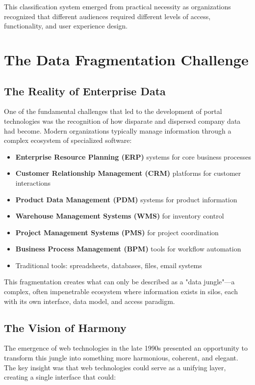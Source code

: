 This classification system emerged from practical necessity as organizations recognized that different audiences required different levels of access, functionality, and user experience design.

\section{The Data Fragmentation Challenge}

\subsection{The Reality of Enterprise Data}

One of the fundamental challenges that led to the development of portal technologies was the recognition of how disparate and dispersed company data had become. Modern organizations typically manage information through a complex ecosystem of specialized software:

\begin{itemize}
\item \textbf{Enterprise Resource Planning (ERP)} systems for core business processes
\item \textbf{Customer Relationship Management (CRM)} platforms for customer interactions
\item \textbf{Product Data Management (PDM)} systems for product information
\item \textbf{Warehouse Management Systems (WMS)} for inventory control
\item \textbf{Project Management Systems (PMS)} for project coordination
\item \textbf{Business Process Management (BPM)} tools for workflow automation
\item Traditional tools: spreadsheets, databases, files, email systems
\end{itemize}

This fragmentation creates what can only be described as a "data jungle"—a complex, often impenetrable ecosystem where information exists in silos, each with its own interface, data model, and access paradigm.

\subsection{The Vision of Harmony}

The emergence of web technologies in the late 1990s presented an opportunity to transform this jungle into something more harmonious, coherent, and elegant. The key insight was that web technologies could serve as a unifying layer, creating a single interface that could:

